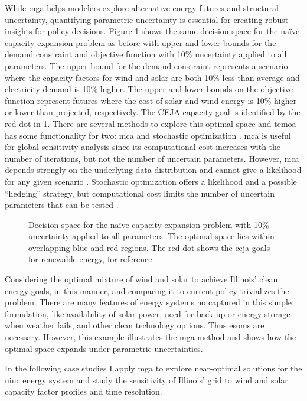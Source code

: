 While \gls{mga} helps modelers explore alternative energy futures and structural
uncertainty, quantifying parametric uncertainty is essential for creating robust insights
for policy decisions. Figure \ref{fig:param-fig} shows the same decision space for
the na\"{i}ve capacity expansion problem as before with upper and lower bounds for
the demand constraint and objective function with 10\% uncertainty applied to all
parameters. The upper bound for the demand constraint represents a scenario where
the capacity factors for wind and solar are both 10\% less than average and electricity
demand is 10\% higher. The upper and lower bounds on the objective function represent
futures where the cost of solar and wind energy is 10\% higher or lower than
projected, respectively. The CEJA capacity goal is identified by the red dot in
\ref{fig:param-fig}. There are several methods to explore this optimal space and
\gls{temoa} has some functionality for two: \gls{mca} \cite{yue_review_2018} and
stochastic optimization \cite{decarolis_multi-stage_2012, bennett_extending_2021}.
\gls{mca} is useful for global sensitivity analysis since its computational
cost increases with the number of iterations, but not the number of uncertain
parameters. However, \gls{mca} depends strongly on the underlying data distribution
and cannot give a likelihood for any given scenario \cite{yue_review_2018}.
Stochastic optimization offers a likelihood and a possible ``hedging'' strategy,
but computational cost limits the number of uncertain parameters that can be
tested \cite{yue_review_2018}.

\begin{figure}[H]
  \centering
  \resizebox{0.8\columnwidth}{!}{}
  \caption{Decision space for the na\"{i}ve capacity expansion problem with
  10\% uncertainty applied to all parameters. The optimal space lies within
  overlapping blue and red regions. The red dot shows the \gls{ceja} goals for
  renewable energy, for reference.}
  \label{fig:param-fig}
\end{figure}
Considering the optimal mixture of wind and solar to achieve Illinois' clean
energy goals, in this manner, and comparing it to current policy trivializes the
problem. There are many features of energy systems no captured in this simple formulation,
like availability of solar power, need for back up or energy storage when weather
fails, and other clean technology options. Thus \glspl{esom} are necessary. However,
this example illustrates the \gls{mga} method and shows how the optimal space
expands under parametric uncertainties.

In the following case studies I apply \gls{mga} to explore near-optimal solutions
for the \gls{uiuc} energy system and study the sensitivity of Illinois' grid to
wind and solar capacity factor profiles and time resolution.
